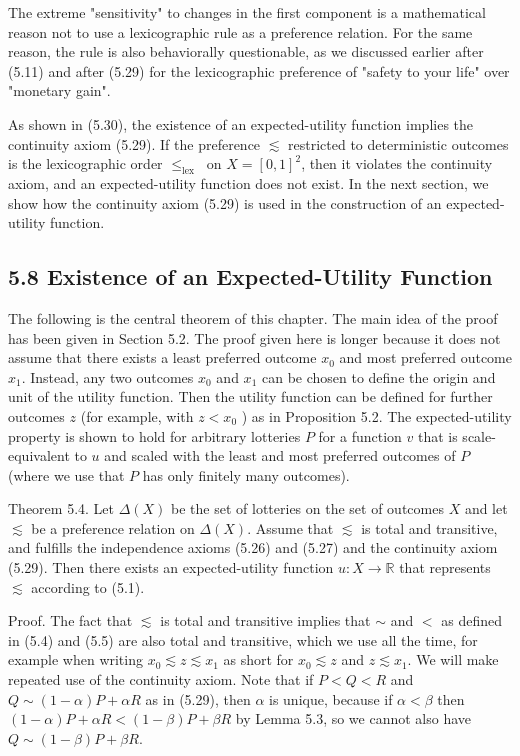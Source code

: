 \documentclass[12pt]{article}
\begin{document}
The extreme "sensitivity" to changes in the first component is a mathematical reason not to use a lexicographic rule as a preference relation. For the same reason, the rule is also behaviorally questionable, as we discussed earlier after (5.11) and after (5.29) for the lexicographic preference of "safety to your life" over "monetary gain".

As shown in (5.30), the existence of an expected-utility function implies the continuity axiom (5.29). If the preference $\lesssim$ restricted to deterministic outcomes is the lexicographic order $\leq_{\text {lex }}$ on $X=[0,1]^{2}$, then it violates the continuity axiom, and an expected-utility function does not exist. In the next section, we show how the continuity axiom (5.29) is used in the construction of an expected-utility function.

\subsection*{5.8 Existence of an Expected-Utility Function}
The following is the central theorem of this chapter. The main idea of the proof has been given in Section 5.2. The proof given here is longer because it does not assume that there exists a least preferred outcome $x_{0}$ and most preferred outcome $x_{1}$. Instead, any two outcomes $x_{0}$ and $x_{1}$ can be chosen to define the origin and unit of the utility function. Then the utility function can be defined for further outcomes $z$ (for example, with $z<x_{0}$ ) as in Proposition 5.2. The expected-utility property is shown to hold for arbitrary lotteries $P$ for a function $v$ that is scale-equivalent to $u$ and scaled with the least and most preferred outcomes of $P$ (where we use that $P$ has only finitely many outcomes).

Theorem 5.4. Let $\Delta(X)$ be the set of lotteries on the set of outcomes $X$ and let $\lesssim$ be a preference relation on $\Delta(X)$. Assume that $\lesssim$ is total and transitive, and fulfills the independence axioms (5.26) and (5.27) and the continuity axiom (5.29). Then there exists an expected-utility function $u: X \rightarrow \mathbb{R}$ that represents $\lesssim$ according to (5.1).

Proof. The fact that $\lesssim$ is total and transitive implies that $\sim$ and $<$ as defined in (5.4) and (5.5) are also total and transitive, which we use all the time, for example when writing $x_{0} \lesssim z \lesssim x_{1}$ as short for $x_{0} \lesssim z$ and $z \lesssim x_{1}$. We will make repeated use of the continuity axiom. Note that if $P<Q<R$ and $Q \sim(1-\alpha) P+\alpha R$ as in (5.29), then $\alpha$ is unique, because if $\alpha<\beta$ then $(1-\alpha) P+\alpha R<(1-\beta) P+\beta R$ by Lemma 5.3, so we cannot also have $Q \sim(1-\beta) P+\beta R$.
\end{document}
